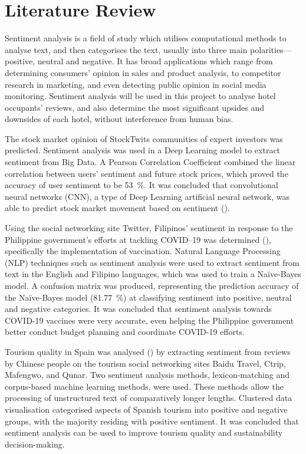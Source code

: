 \documentclass[12pt, bibliography=totocnumbered, paper=a4]{scrartcl}
\begin{document}
\section{Literature Review}
Sentiment analysis is a field of study which utilises computational methods to analyse text,
and then categorises the text, usually into three main polarities---positive, neutral
and negative. It has broad applications which range from determining consumers' opinion in
sales and product analysis, to competitor research in marketing, and even detecting public
opinion in social media monitoring. Sentiment analysis will be used in this project to
analyse hotel occupants' reviews, and also determine the most significant upsides
and downsides of each hotel, without interference from human bias.

The stock market opinion of StockTwits communities
of expert investors was predicted. Sentiment analysis was used in a Deep Learning model to extract
sentiment from Big Data. A Pearson Correlation Coefficient combined the linear correlation
between users' sentiment and future stock prices, which
proved the accuracy of user sentiment to be \qty{53}{\percent}.
It was concluded that convolutional neural networks (CNN), a type of Deep Learning
artificial neural network, was able to predict stock market movement based on sentiment (\cite{stock}).

Using the social networking site Twitter,
Filipinos' sentiment in response to the Philippine government's efforts
at tackling COVID--19 was determined (\cite{twitter}), specifically the implementation of vaccination. Natural
Language Processing (NLP) techniques such as sentiment analysis were used to
extract sentiment from text in the English and Filipino languages, which was used to
train a Naïve-Bayes model. A confusion matrix was produced, representing the
prediction accuracy of the Naïve-Bayes model (\qty{81.77}{\percent}) at classifying
sentiment into positive, neutral and negative categories. It was concluded that
sentiment analysis towards COVID-19 vaccines were very accurate, even helping the
Philippine government better conduct budget planning and coordinate COVID-19 efforts.

Tourism quality in Spain was analysed (\cite{spain}) by
extracting sentiment from reviews by Chinese people on the tourism
social networking sites Baidu Travel, Ctrip, Mafengwo, and Qunar.
Two sentiment analysis methods, lexicon-matching and corpus-based machine
learning methods, were used. These methods allow the processing of
unstructured text of comparatively longer lengths. Clustered data
visualisation categorised aspects of Spanish tourism into positive
and negative groups, with the majority residing with positive sentiment.
It was concluded that sentiment analysis can be used to improve tourism
quality and sustainability decision-making.
\end{document}
